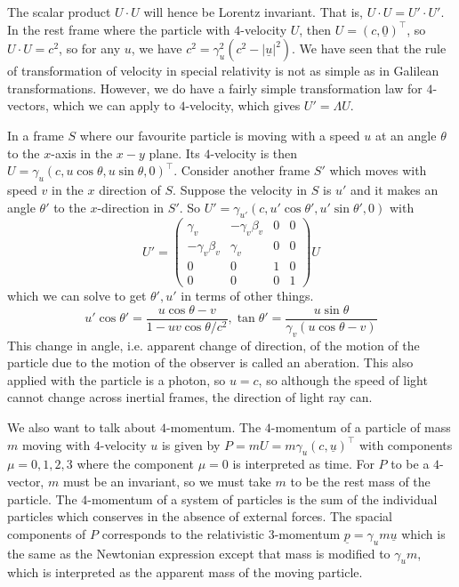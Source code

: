 The scalar product $U\cdot U$ will hence be Lorentz invariant.
That is, $U\cdot U=U'\cdot U'$.
In the rest frame where the particle with $4$-velocity $U$, then $U=(c,\underline{0})^\top$, so $U\cdot U=c^2$, so for any $u$, we have $c^2=\gamma_u^2(c^2-|\underline{u}|^2)$.
We have seen that the rule of transformation of velocity in special relativity is not as simple as in Galilean transformations.
However, we do have a fairly simple transformation law for $4$-vectors, which we can apply to $4$-velocity, which gives $U'=\Lambda U$.
\begin{example}
    In a frame $S$ where our favourite particle is moving with a speed $u$ at an angle $\theta$ to the $x$-axis in the $x-y$ plane.
    Its $4$-velocity is then $U=\gamma_u(c,u\cos\theta,u\sin\theta,0)^\top$.
    Consider another frame $S'$ which moves with speed $v$ in the $x$ direction of $S$.
    Suppose the velocity in $S$ is $u'$ and it makes an angle $\theta'$ to the $x$-direction in $S'$.
    So $U'=\gamma_{u'}(c,u'\cos\theta',u'\sin\theta',0)$ with
    $$U'=\begin{pmatrix}
        \gamma_v&-\gamma_v\beta_v&0&0\\
        -\gamma_v\beta_v&\gamma_v&0&0\\
        0&0&1&0\\
        0&0&0&1
    \end{pmatrix}U$$
    which we can solve to get $\theta',u'$ in terms of other things.
    $$u'\cos\theta'=\frac{u\cos\theta-v}{1-uv\cos\theta/c^2},\tan\theta'=\frac{u\sin\theta}{\gamma_v(u\cos\theta-v)}$$
    This change in angle, i.e. apparent change of direction, of the motion of the particle due to the motion of the observer is called an aberation.
    This also applied with the particle is a photon, so $u=c$, so although the speed of light cannot change across inertial frames, the direction of light ray can.
\end{example}
We also want to talk about $4$-momentum.
The $4$-momentum of a particle of mass $m$ moving with $4$-velocity $u$ is given by $P=mU=m\gamma_u(c,\underline{u})^\top$ with components $\mu=0,1,2,3$ where the component $\mu=0$ is interpreted as time.
For $P$ to be a $4$-vector, $m$ must be an invariant, so we must take $m$ to be the rest mass of the particle.
The $4$-momentum of a system of particles is the sum of the individual particles which conserves in the absence of external forces.
The spacial components of $P$ corresponds to the relativistic $3$-momentum $\underline{p}=\gamma_um\underline{u}$ which is the same as the Newtonian expression except that mass is modified to $\gamma_um$, which is interpreted as the apparent mass of the moving particle.
